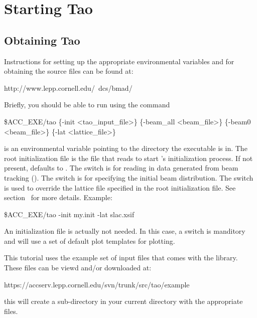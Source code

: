 \chapter{Starting Tao}
\label{c:starting.tao}

\section{Obtaining Tao}
\label{s:obtaining}

Instructions for setting up the appropriate environmental variables
and for obtaining the source files can be found at:
\begin{example}
  http://www.lepp.cornell.edu/~dcs/bmad/
\end{example}

Briefly, you should be able to run \tao using the command
\begin{example}
  \$ACC_EXE/tao \{-init <tao_input_file>\} \{-beam_all <beam_file>\} 
           \{-beam0 <beam_file>\} \{-lat <lattice_file>\}
\end{example}
 is an environmental variable pointing to the directory
the \tao executable is in.  The root initialization file
 is the file that \tao reads to start \tao's
initialization process. If not present,  defaults
to . The  switch is for reading in data
generated from beam tracking (). The 
switch is for specifying the initial beam distribution.  The
 switch is used to override the lattice file specified in
the root initialization file. See section~ for
more details. Example:
\begin{example}
  \$ACC_EXE/tao -init my.init -lat slac.xsif
\end{example}
An initialization file is actually not needed. In this case, a
 switch is manditory and \tao will use a set of default plot
templates for plotting.

This tutorial uses the example set of input files that comes with the \tao library.
These files can be viewd and/or downloaded at:
\begin{example}
  https://accserv.lepp.cornell.edu/svn/trunk/src/tao/example
\end{example}
this will create a sub-directory  in your current directory with 
the appropriate files.

